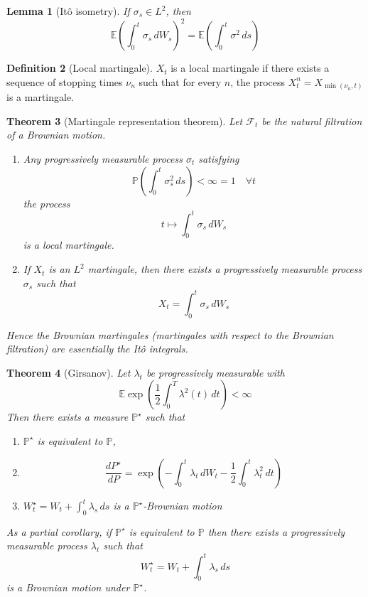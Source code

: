 \documentclass[10pt, oneside, reqno]{amsart}
\theoremstyle{plain}%
\newtheorem{thm}{Theorem}[section]
\newtheorem{lem}[thm]{Lemma}
\theoremstyle{definition}
\newtheorem{defn}[thm]{Definition}
\theoremstyle{remark}
\newcommand{\sigf}{\mathcal{F}}
\newcommand{\E}{\mathbb{E}}
\renewcommand{\P}{\mathbb{P}}
\begin{document}
\begin{lem}[It\^o isometry]
	If $\sigma_s \in L^2$, then \[
		\E(\int_0^t \sigma_s \, dW_s)^2 = \E(\int_0^t \sigma^2 \, ds)
	\]
\end{lem}

\begin{defn}[Local martingale]
	$X_t$ is a local martingale if there exists a sequence of stopping times $\nu_n$ such that for every $n$, the process $X^n_t = X_{\min(\nu_n, t)}$ is a martingale.  
\end{defn}

\begin{thm}[Martingale representation theorem]
	Let $\sigf_t$ be the natural filtration of a Brownian motion.  \begin{enumerate}
		\item Any progressively measurable process $\sigma_t$ satisfying \[\P(\int_0^t \sigma_s^2 \, ds) < \infty = 1 \quad \forall t \] the process \[
			t \mapsto \int_0^t \sigma_s \, dW_s
		\] is a local martingale. 
		\item If $X_t$ is an $L^2$ martingale, then there exists a progressively measurable process $\sigma_s$ such that \[
			X_t = \int_0^t \sigma_s \, dW_s
		\] 
	\end{enumerate}
	
	Hence the Brownian martingales (martingales with respect to the Brownian filtration) are essentially the It\^o integrals.
\end{thm}

\begin{thm}[Girsanov]
	Let $\lambda_t$ be progressively measurable with \[
		\E\exp(\frac{1}{2} \int_0^T \lambda^2(t) \, dt) < \infty
	\] Then there exists a measure $\P^\star$ such that \begin{enumerate}
		\item $\P^\star$ is equivalent to $\P$, 
		\item \[
		\frac{dP^\star}{dP} = \exp( - \int_0^t \lambda_t \, dW_t - \frac{1}{2} \int_0^t	\lambda^2_t \, dt )
		\]
		\item $W^\star_t = W_t + \int_0^t \lambda_s \, ds$ is a $\P^\star$-Brownian motion
	\end{enumerate} 
	
	As a partial corollary, if $\P^\star$ is equivalent to $\P$ then there exists a progressively measurable process $\lambda_t$ such that \[
		W^\star_t = W_t + \int_0^t \lambda_s \, ds
	\] is a Brownian motion under $\P^\star$.  
\end{thm}
\end{document}
